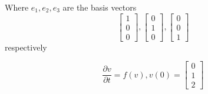 {Where $e_1, e_2, e_3$ are the basis vectors
\[
\begin{bmatrix}
1\\
0\\
0
\end{bmatrix},
\begin{bmatrix}
0\\
1\\
0
\end{bmatrix},
\begin{bmatrix}
0\\
0\\
1
\end{bmatrix}
\]
respectively

\[
\frac{\partial v}{\partial t}=f(v), v(0)=\begin{bmatrix}
0\\
1\\
2
\end{bmatrix}
\]


}
